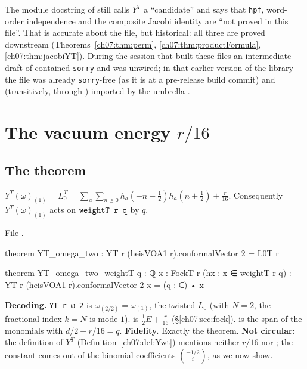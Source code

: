 \begin{warning}
The module docstring of  still calls $Y^T$ a
``candidate'' and says that \verb|hpf|, word-order independence and the composite Jacobi
identity are ``not proved in this file''. That is accurate about the file, but historical: all
three are proved downstream (Theorems~\ref{ch07:thm:perm}, \ref{ch07:thm:productFormula},
\ref{ch07:thm:jacobiYT}). During the session that built these files an
intermediate draft of  contained \texttt{sorry}
and was unwired; in that earlier version of the library the file was already \texttt{sorry}-free (as it is at a pre-release build commit) and (transitively, through ) imported by the umbrella .
\end{warning}

\section{The vacuum energy \texorpdfstring{$r/16$}{r/16}}\label{ch07:sec:L0}

\subsection{The theorem}

\begin{theorem}\label{ch07:thm:L0}
$Y^T(\omega)_{(1)} = L_0^T = \sum_a\sum_{n\ge0}h_a(-n-\tfrac12)h_a(n+\tfrac12) + \tfrac r{16}$.
Consequently $Y^T(\omega)_{(1)}$ acts on $\lean{weightT r q}$ by $q$.
\end{theorem}

\noindent File .
\begin{leancode}
theorem YT_omega_two : YT r (heisVOA1 r).conformalVector 2 = L0T r

theorem YT_omega_two_weightT {q : ℚ} {x : FockT r} (hx : x ∈ weightT r q) :
    YT r (heisVOA1 r).conformalVector 2 x = (q : ℂ) • x
\end{leancode}

\begin{dictionary}
\textbf{Decoding.} \verb|YT r ω 2| is $\omega_{(2/2)} = \omega_{(1)}$, the twisted $L_0$
(with $N=2$, the fractional index $k=N$ is mode $1$).  is
$\frac12E+\frac r{16}$ (\S\ref{ch07:sec:fock}).  is the span of the monomials
with $d/2+r/16 = q$. \textbf{Fidelity.} Exactly the theorem. \textbf{Not circular:} the
definition of $Y^T$ (Definition~\ref{ch07:def:Ywt}) mentions neither $r/16$ nor ; the
constant comes out of the binomial coefficients $\binom{-1/2}{i}$, as we now show.
\end{dictionary}

